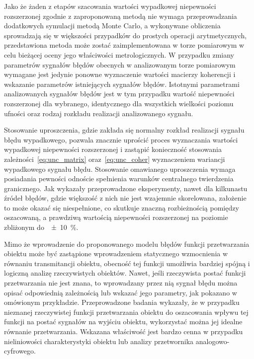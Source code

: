 Jako że żaden z etapów szacowania wartości wypadkowej niepewności rozszerzonej zgodnie z zaproponowaną metodą nie wymaga przeprowadzania dodatkowych symulacji metodą Monte Carlo, a wykonywane obliczenia sprowadzają się w większości przypadków do prostych operacji arytmetycznych, przedstawiona metoda może zostać zaimplementowana w torze pomiarowym w celu bieżącej oceny jego właściwości metrologicznych. W przypadku zmiany parametrów sygnałów błędów obecnych w analizowanym torze pomiarowym wymagane jest jedynie ponowne wyznaczenie wartości macierzy koherencji i wskazanie parametrów istniejących sygnałów błędów. Istotnymi parametrami analizowanych sygnałów błędów jest w tym przypadku wartość niepewności rozszerzonej dla wybranego, identycznego dla wszystkich wielkości poziomu ufności oraz rodzaj rozkładu realizacji analizowanego sygnału.

Stosowanie uproszczenia, gdzie zakłada się normalny rozkład realizacji sygnału błędu wypadkowego, pozwala znacznie uprościć proces wyznaczania wartości wypadkowej niepewności rozszerzonej i zastąpić konieczność stosowania zależności~\eqref{eq:unc_matrix} oraz~\eqref{eq:unc_coher} wyznaczeniem wariancji wypadkowego sygnału błędu. Stosowanie omawianego uproszczenia wymaga posiadania pewności odnoście spełnienia warunków centralnego twierdzenia granicznego. Jak wykazały przeprowadzone eksperymenty, nawet dla kilkunastu źródeł błędów, gdzie większość z nich nie jest wzajemnie skorelowana, założenie to może okazać się niespełnione, co skutkuje znaczną rozbieżnością pomiędzy oszacowaną, a prawdziwą wartością niepewności rozszerzonej na poziomie zbliżonym do~\qty{\pm 10}{\percent}.

Mimo że wprowadzenie do proponowanego modelu błędów funkcji przetwarzania obiektu może być zastąpione wprowadzeniem statycznego wzmocnienia w równaniu transmitancji obiektu, obecność tej funkcji umożliwia bardziej spójną i logiczną analizę rzeczywistych obiektów. Nawet, jeśli rzeczywista postać funkcji przetwarzania nie jest znana, to wprowadzany przez nią sygnał błędu można opisać odpowiednią zależnością lub wskazać jego parametry, jak pokazano w omówionym przykładzie. Przeprowadzone badania wykazały, że w przypadku nieznanej rzeczywistej funkcji przetwarzania obiektu do oszacowania wpływu tej funkcji na postać sygnałów na wyjściu obiektu, wykorzystać można jej idealne równanie przetwarzania. Wskazana właściwość jest bardzo cenna w przypadku nieliniowości charakterystyki obiektu lub analizy przetwornika analogowo-cyfrowego.
